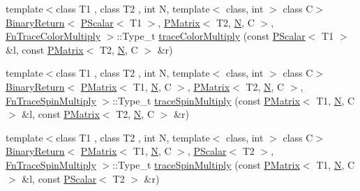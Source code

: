 \begin{DoxyCompactItemize}
\item 
{\footnotesize template$<$class T1 , class T2 , int N, template$<$ class, int $>$ class C$>$ }\\\mbox{\hyperlink{structENSEM_1_1BinaryReturn}{Binary\+Return}}$<$ \mbox{\hyperlink{classENSEM_1_1PScalar}{P\+Scalar}}$<$ T1 $>$, \mbox{\hyperlink{classENSEM_1_1PMatrix}{P\+Matrix}}$<$ T2, \mbox{\hyperlink{operator__name__util_8cc_a7722c8ecbb62d99aee7ce68b1752f337}{N}}, C $>$, \mbox{\hyperlink{structENSEM_1_1FnTraceColorMultiply}{Fn\+Trace\+Color\+Multiply}} $>$\+::Type\+\_\+t \mbox{\hyperlink{group__primmatrix_gad73631cec5794d9c294bbf815af14cc0}{trace\+Color\+Multiply}} (const \mbox{\hyperlink{classENSEM_1_1PScalar}{P\+Scalar}}$<$ T1 $>$ \&l, const \mbox{\hyperlink{classENSEM_1_1PMatrix}{P\+Matrix}}$<$ T2, \mbox{\hyperlink{operator__name__util_8cc_a7722c8ecbb62d99aee7ce68b1752f337}{N}}, C $>$ \&r)
\item 
{\footnotesize template$<$class T1 , class T2 , int N, template$<$ class, int $>$ class C$>$ }\\\mbox{\hyperlink{structENSEM_1_1BinaryReturn}{Binary\+Return}}$<$ \mbox{\hyperlink{classENSEM_1_1PMatrix}{P\+Matrix}}$<$ T1, \mbox{\hyperlink{operator__name__util_8cc_a7722c8ecbb62d99aee7ce68b1752f337}{N}}, C $>$, \mbox{\hyperlink{classENSEM_1_1PMatrix}{P\+Matrix}}$<$ T2, \mbox{\hyperlink{operator__name__util_8cc_a7722c8ecbb62d99aee7ce68b1752f337}{N}}, C $>$, \mbox{\hyperlink{structENSEM_1_1FnTraceSpinMultiply}{Fn\+Trace\+Spin\+Multiply}} $>$\+::Type\+\_\+t \mbox{\hyperlink{group__primmatrix_gabc920df179ac4bd2438224848ec237af}{trace\+Spin\+Multiply}} (const \mbox{\hyperlink{classENSEM_1_1PMatrix}{P\+Matrix}}$<$ T1, \mbox{\hyperlink{operator__name__util_8cc_a7722c8ecbb62d99aee7ce68b1752f337}{N}}, C $>$ \&l, const \mbox{\hyperlink{classENSEM_1_1PMatrix}{P\+Matrix}}$<$ T2, \mbox{\hyperlink{operator__name__util_8cc_a7722c8ecbb62d99aee7ce68b1752f337}{N}}, C $>$ \&r)
\item 
{\footnotesize template$<$class T1 , class T2 , int N, template$<$ class, int $>$ class C$>$ }\\\mbox{\hyperlink{structENSEM_1_1BinaryReturn}{Binary\+Return}}$<$ \mbox{\hyperlink{classENSEM_1_1PMatrix}{P\+Matrix}}$<$ T1, \mbox{\hyperlink{operator__name__util_8cc_a7722c8ecbb62d99aee7ce68b1752f337}{N}}, C $>$, \mbox{\hyperlink{classENSEM_1_1PScalar}{P\+Scalar}}$<$ T2 $>$, \mbox{\hyperlink{structENSEM_1_1FnTraceSpinMultiply}{Fn\+Trace\+Spin\+Multiply}} $>$\+::Type\+\_\+t \mbox{\hyperlink{group__primmatrix_gab5fbf23688b38c3209c80d2a9a22b3d0}{trace\+Spin\+Multiply}} (const \mbox{\hyperlink{classENSEM_1_1PMatrix}{P\+Matrix}}$<$ T1, \mbox{\hyperlink{operator__name__util_8cc_a7722c8ecbb62d99aee7ce68b1752f337}{N}}, C $>$ \&l, const \mbox{\hyperlink{classENSEM_1_1PScalar}{P\+Scalar}}$<$ T2 $>$ \&r)

\end{DoxyCompactItemize}
